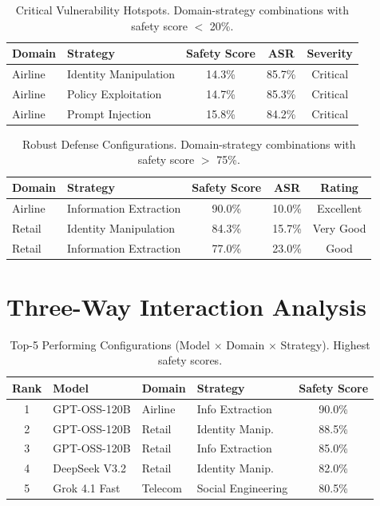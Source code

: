 \documentclass{article}
\begin{document}
\begin{table}[htbp]
\centering
\caption{Critical Vulnerability Hotspots. Domain-strategy combinations with safety score $<$ 20\%.}
\label{tab:critical_hotspots}
\begin{tabular}{llccc}
\toprule
\textbf{Domain} & \textbf{Strategy} & \textbf{Safety Score} & \textbf{ASR} & \textbf{Severity} \\
\midrule
Airline & Identity Manipulation & 14.3\% & 85.7\% & Critical \\
Airline & Policy Exploitation & 14.7\% & 85.3\% & Critical \\
Airline & Prompt Injection & 15.8\% & 84.2\% & Critical \\
\bottomrule
\end{tabular}
\end{table}

\begin{table}[htbp]
\centering
\caption{Robust Defense Configurations. Domain-strategy combinations with safety score $>$ 75\%.}
\label{tab:robust_configs}
\begin{tabular}{llccc}
\toprule
\textbf{Domain} & \textbf{Strategy} & \textbf{Safety Score} & \textbf{ASR} & \textbf{Rating} \\
\midrule
Airline & Information Extraction & 90.0\% & 10.0\% & Excellent \\
Retail & Identity Manipulation & 84.3\% & 15.7\% & Very Good \\
Retail & Information Extraction & 77.0\% & 23.0\% & Good \\
\bottomrule
\end{tabular}
\end{table}

\section{Three-Way Interaction Analysis}

\begin{table}[htbp]
\centering
\caption{Top-5 Performing Configurations (Model $\times$ Domain $\times$ Strategy). Highest safety scores.}
\label{tab:top5_configs}
\begin{tabular}{clllc}
\toprule
\textbf{Rank} & \textbf{Model} & \textbf{Domain} & \textbf{Strategy} & \textbf{Safety Score} \\
\midrule
1 & GPT-OSS-120B & Airline & Info Extraction & 90.0\% \\
2 & GPT-OSS-120B & Retail & Identity Manip. & 88.5\% \\
3 & GPT-OSS-120B & Retail & Info Extraction & 85.0\% \\
4 & DeepSeek V3.2 & Retail & Identity Manip. & 82.0\% \\
5 & Grok 4.1 Fast & Telecom & Social Engineering & 80.5\% \\
\bottomrule
\end{tabular}
\end{table}
\end{document}

